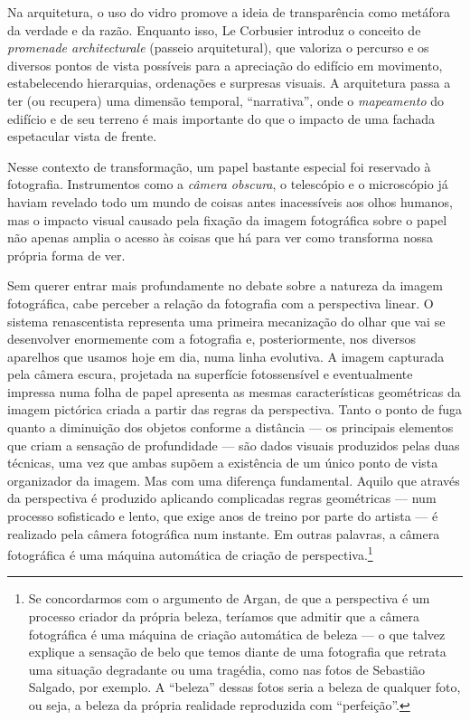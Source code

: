 Na arquitetura, o uso do vidro promove a ideia de transparência como
metáfora da verdade e da razão. Enquanto isso, Le Corbusier introduz o
conceito de \emph{promenade architecturale} (passeio arquitetural), que
valoriza o percurso e os diversos pontos de vista possíveis para a
apreciação do edifício em movimento, estabelecendo hierarquias,
ordenações e surpresas visuais. A arquitetura passa a ter (ou recupera)
uma dimensão temporal, ``narrativa'', onde o \emph{mapeamento} do
edifício e de seu terreno é mais importante do que o impacto de uma fachada
espetacular vista de frente.

Nesse contexto de transformação, um papel bastante especial foi
reservado à fotografia. Instrumentos como a \emph{câmera obscura}, o
telescópio e o microscópio já haviam revelado todo um mundo de coisas
antes inacessíveis aos olhos humanos, mas o impacto visual causado pela
fixação da imagem fotográfica sobre o papel não apenas amplia o acesso
às coisas que há para ver como transforma nossa própria forma de ver.

Sem querer entrar mais profundamente no debate sobre a natureza da
imagem fotográfica, cabe perceber a relação da fotografia com a
perspectiva linear. O sistema renascentista representa uma primeira
mecanização do olhar que vai se desenvolver enormemente com a fotografia
e, posteriormente, nos diversos aparelhos que usamos hoje em dia, numa
linha evolutiva. A imagem capturada pela câmera escura, projetada na
superfície fotossensível e eventualmente impressa numa folha de papel
apresenta as mesmas características geométricas da imagem pictórica
criada a partir das regras da perspectiva. Tanto o ponto de fuga quanto
a diminuição dos objetos conforme a distância --- os principais elementos
que criam a sensação de profundidade --- são dados visuais produzidos
pelas duas técnicas, uma vez que ambas supõem a existência de um único
ponto de vista organizador da imagem.
Mas com uma diferença fundamental. Aquilo que através da perspectiva é
produzido aplicando complicadas regras geométricas --- num processo
sofisticado e lento, que exige anos de treino por parte do artista --- é
realizado pela câmera fotográfica num instante. Em outras palavras, a
câmera fotográfica é uma máquina automática de criação de \label{automatica}
perspectiva.\footnote{Se concordarmos com o argumento de Argan, de que a
  perspectiva é um processo criador da própria beleza, teríamos que
  admitir que a câmera fotográfica é uma máquina de criação automática
  de beleza --- o que talvez explique a sensação de belo que temos diante
  de uma fotografia que retrata uma situação degradante ou uma tragédia,
  como nas fotos de Sebastião Salgado, por exemplo. A ``beleza'' dessas
  fotos seria a beleza de qualquer foto, ou seja, a beleza da própria
  realidade reproduzida com ``perfeição''.}

